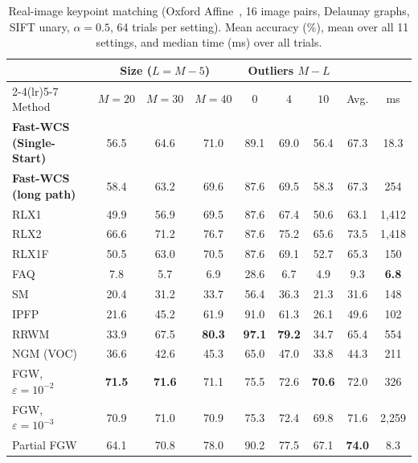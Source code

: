 \begin{table}[!t]
\centering
\caption{Real-image keypoint matching (Oxford Affine~\cite{mikolajczyk2005comparison}, 16 image pairs, Delaunay graphs, SIFT unary, $\alpha{=}0.5$, 64 trials per setting). Mean accuracy (\%), mean over all 11 settings, and median time (ms) over all trials.}
\label{tab:image}
\fontsize{6.2}{7.4}\selectfont
\setlength{\tabcolsep}{1.6pt}
\begin{tabular*}{\columnwidth}{@{\extracolsep{\fill}}lcccccccc@{}}
\toprule
 & \multicolumn{3}{c}{Size ($L{=}M{-}5$)} & \multicolumn{3}{c}{Outliers $M{-}L$} & & \\
\cmidrule(lr){2-4}\cmidrule(lr){5-7}
Method & $M{=}20$ & $M{=}30$ & $M{=}40$ & $0$ & $4$ & $10$ & Avg. & ms \\
\midrule
\textbf{Fast-WCS (Single-Start)} & 56.5 & 64.6 & 71.0 & 89.1 & 69.0 & 56.4 & 67.3 & 18.3 \\
\textbf{Fast-WCS (long path)} & 58.4 & 63.2 & 69.6 & 87.6 & 69.5 & 58.3 & 67.3 & 254 \\
\midrule
RLX1~\cite{yang2018algorithm} & 49.9 & 56.9 & 69.5 & 87.6 & 67.4 & 50.6 & 63.1 & 1{,}412 \\
RLX2~\cite{yang2018algorithm} & 66.6 & 71.2 & 76.7 & 87.6 & 75.2 & 65.6 & 73.5 & 1{,}418 \\
RLX1F~\cite{yang2018algorithm} & 50.5 & 63.0 & 70.5 & 87.6 & 69.1 & 52.7 & 65.3 & 150 \\
\midrule
FAQ~\cite{vogelstein2015fast} & 7.8 & 5.7 & 6.9 & 28.6 & 6.7 & 4.9 & 9.3 & \textbf{6.8} \\
SM~\cite{leordeanu2005} & 20.4 & 31.2 & 33.7 & 56.4 & 36.3 & 21.3 & 31.6 & 148 \\
IPFP~\cite{leordeanu2009ipfp} & 21.6 & 45.2 & 61.9 & 91.0 & 61.3 & 26.1 & 49.6 & 102 \\
RRWM~\cite{cho2010rrwm} & 33.9 & 67.5 & \textbf{80.3} & \textbf{97.1} & \textbf{79.2} & 34.7 & 65.4 & 554 \\
NGM (VOC)~\cite{wang2021ngm} & 36.6 & 42.6 & 45.3 & 65.0 & 47.0 & 33.8 & 44.3 & 211 \\
FGW, $\varepsilon{=}10^{-2}$~\cite{titouan2019optimal} & \textbf{71.5} & \textbf{71.6} & 71.1 & 75.5 & 72.6 & \textbf{70.6} & 72.0 & 326 \\
FGW, $\varepsilon{=}10^{-3}$~\cite{titouan2019optimal} & 70.9 & 71.0 & 70.9 & 75.3 & 72.4 & 69.8 & 71.6 & 2{,}259 \\
Partial FGW~\cite{chapel2020partial} & 64.1 & 70.8 & 78.0 & 90.2 & 77.5 & 67.1 & \textbf{74.0} & 8.3 \\
\bottomrule
\end{tabular*}
\end{table}
